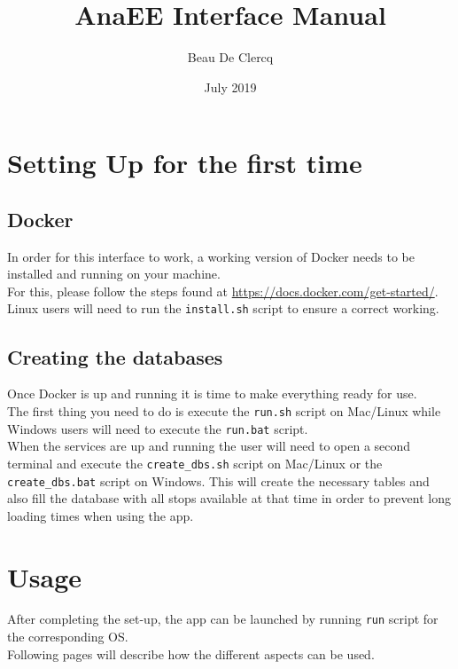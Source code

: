 \documentclass[12pt]{article}
\title{AnaEE Interface Manual}
\author{Beau De Clercq}
\date{July 2019}
\begin{document}
\maketitle{}

\tableofcontents

\clearpage
\newpage

\section{Setting Up for the first time}
\subsection{Docker}
In order for this interface to work, a working version of Docker needs to be installed and running on your machine.\\
For this, please follow the steps found at \url{https://docs.docker.com/get-started/}.\\
Linux users will need to run the \texttt{install.sh} script to ensure a correct working.

\subsection{Creating the databases}
Once Docker is up and running it is time to make everything ready for use.\\
The first thing you need to do is execute the \texttt{run.sh} script on Mac/Linux while Windows users will need to execute the \texttt{run.bat} script.\\
When the services are up and running the user will need to open a second terminal and execute the \texttt{create\_dbs.sh} script on Mac/Linux or the \texttt{create\_dbs.bat} script on Windows. This  will create the necessary tables and also fill the database with all stops available at that time in order to prevent long loading times when using the app.

\newpage

\section{Usage}
After completing the set-up, the app can be launched by running \texttt{run} script for the corresponding OS.\\
Following pages will describe how the different aspects can be used.
\end{document}
